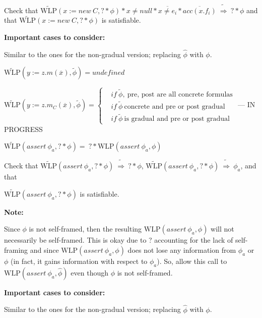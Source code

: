 \documentclass {article}
\newcommand{\fphi}{\widehat{\phi}}
\newcommand{\tphi}{\widetilde{\phi}}
\newcommand{\timp}{\ \widetilde{\Rightarrow}\ }
\newcommand{\wlp}[2]{\text{WLP}(#1,#2)}
\newcommand{\twlp}[2]{\widetilde{\text{WLP}}(#1,#2)}
\begin{document}
Check that $\twlp{x := new\ C}{? \ast \phi} \ast x \neq null \ast \overline{x \neq e_i} \ast \overline{acc(x.f_i)} \timp ? \ast \phi$ and that $\twlp{x := new\ C}{? \ast \phi}$ is satisfiable.

\textbf{Important cases to consider:}

Similar to the ones for the non-gradual version; replacing $\fphi$ with $\phi$.

\vspace{0.5cm}

$\twlp{y := z.m(\overline{x})}{\tphi} = undefined$

\vspace{0.5cm}

$\twlp{y := z.m_C(\overline{x})}{\tphi} = 
	\begin{cases}
		& if \ \tphi, \ \text{pre, post are all concrete formulas} \\
		& if \ \tphi \ \text{concrete and pre or post gradual} \\
		& if \ \tphi \ \text{is gradual and pre or post gradual}
	\end{cases}
$ --- IN PROGRESS

\vspace{0.5cm}

$\twlp{assert\ \phi_a}{? \ast \phi} = \ ? \ast \wlp{assert\ \phi_a}{\phi}$

Check that $\twlp{assert\ \phi_a}{? \ast \phi} \timp ? \ast \phi$, $\twlp{assert\ \phi_a}{? \ast \phi} \timp \phi_a$, and that 

\noindent $\twlp{assert\ \phi_a}{? \ast \phi}$ is satisfiable.

\textbf{Note:}

Since $\phi$ is not self-framed, then the resulting $\wlp{assert\ \phi_a}{\phi}$ will not necessarily be self-framed. This is okay due to ? accounting for the lack of self-framing and since $\wlp{assert\ \phi_a}{\phi}$ does not lose any information from $\phi_a$ or $\phi$ (in fact, it gains information with respect to $\phi_a$). So, allow this call to $\wlp{assert\ \phi_a}{\fphi}$ even though $\phi$ is not self-framed.

\textbf{Important cases to consider:}

Similar to the ones for the non-gradual version; replacing $\fphi$ with $\phi$.

\vspace{0.5cm}
%
%
%
%
\end{document}
